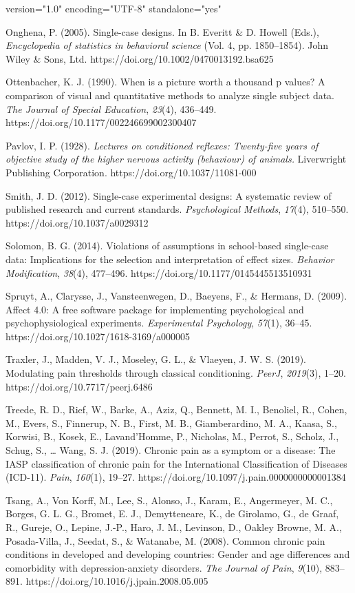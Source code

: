 version="1.0" encoding="UTF-8" standalone="yes" \documentclass{article}
\begin{document}
Onghena, P. (2005). Single-case designs. In B. Everitt \& D. Howell (Eds.), \emph{Encyclopedia of statistics in behavioral science} (Vol. 4, pp. 1850--1854). John Wiley \& Sons, Ltd. https://doi.org/10.1002/0470013192.bsa625

Ottenbacher, K. J. (1990). When is a picture worth a thousand p values? A comparison of visual and quantitative methods to analyze single subject data. \emph{The Journal of Special Education}, \emph{23}(4), 436--449. https://doi.org/10.1177/002246699002300407

Pavlov, I. P. (1928). \emph{Lectures on conditioned reflexes: Twenty-five years of objective study of the higher nervous activity (behaviour) of animals.} Liverwright Publishing Corporation. https://doi.org/10.1037/11081-000

Smith, J. D. (2012). Single-case experimental designs: A systematic review of published research and current standards. \emph{Psychological Methods}, \emph{17}(4), 510--550. https://doi.org/10.1037/a0029312

Solomon, B. G. (2014). Violations of assumptions in school-based single-case data: Implications for the selection and interpretation of effect sizes. \emph{Behavior Modification}, \emph{38}(4), 477--496. https://doi.org/10.1177/0145445513510931

Spruyt, A., Clarysse, J., Vansteenwegen, D., Baeyens, F., \& Hermans, D. (2009). Affect 4.0: A free software package for implementing psychological and psychophysiological experiments. \emph{Experimental Psychology}, \emph{57}(1), 36--45. https://doi.org/10.1027/1618-3169/a000005

Traxler, J., Madden, V. J., Moseley, G. L., \& Vlaeyen, J. W. S. (2019). Modulating pain thresholds through classical conditioning. \emph{PeerJ}, \emph{2019}(3), 1--20. https://doi.org/10.7717/peerj.6486

Treede, R. D., Rief, W., Barke, A., Aziz, Q., Bennett, M. I., Benoliel, R., Cohen, M., Evers, S., Finnerup, N. B., First, M. B., Giamberardino, M. A., Kaasa, S., Korwisi, B., Kosek, E., Lavand'Homme, P., Nicholas, M., Perrot, S., Scholz, J., Schug, S., … Wang, S. J. (2019). Chronic pain as a symptom or a disease: The IASP classification of chronic pain for the International Classification of Diseases (ICD-11). \emph{Pain}, \emph{160}(1), 19--27. https://doi.org/10.1097/j.pain.0000000000001384

Tsang, A., Von Korff, M., Lee, S., Alonso, J., Karam, E., Angermeyer, M. C., Borges, G. L. G., Bromet, E. J., Demytteneare, K., de Girolamo, G., de Graaf, R., Gureje, O., Lepine, J.-P., Haro, J. M., Levinson, D., Oakley Browne, M. A., Posada-Villa, J., Seedat, S., \& Watanabe, M. (2008). Common chronic pain conditions in developed and developing countries: Gender and age differences and comorbidity with depression-anxiety disorders. \emph{The Journal of Pain}, \emph{9}(10), 883--891. https://doi.org/10.1016/j.jpain.2008.05.005
\end{document}
